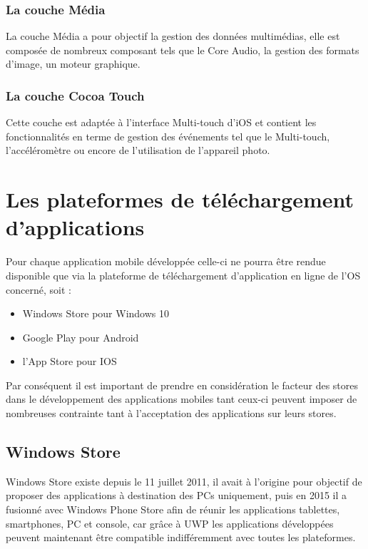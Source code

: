 \documentclass[11]{article}
\begin{document}
\subsubsection{La couche Média}
La couche Média a pour objectif la gestion des données multimédias, elle est composée de nombreux composant tels que le Core Audio, la gestion des formats d’image, un moteur graphique.

\subsubsection{La couche Cocoa Touch}
Cette couche est adaptée à l’interface Multi-touch d’iOS et contient les fonctionnalités en terme de gestion des événements tel que le Multi-touch, l’accéléromètre ou encore de l’utilisation de l’appareil photo.


\section{Les plateformes de téléchargement d’applications}
Pour chaque application mobile développée celle-ci ne pourra être rendue disponible que via la plateforme de téléchargement d’application en ligne de l’OS concerné, soit :

\begin{itemize}
\item Windows Store pour Windows 10
\item Google Play pour Android
\item l’App Store pour IOS 
\end{itemize}
  
 \vspace{0.5cm}
 
Par conséquent il est important de prendre en considération le facteur des stores dans le développement des applications mobiles tant ceux-ci peuvent imposer de nombreuses contrainte tant à l’acceptation des applications sur leurs stores.


\subsection{Windows Store}
Windows Store existe depuis le 11 juillet 2011, il avait à l’origine pour objectif de proposer des applications à destination des PCs uniquement, puis en 2015 il a fusionné avec Windows Phone Store afin de réunir les applications tablettes, smartphones, PC et console, car grâce à UWP les applications développées peuvent maintenant être compatible indifféremment avec toutes les plateformes.
   
\end{document}
